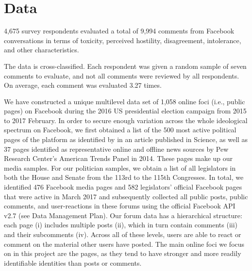 \documentclass{article}
\begin{document}

\section{Data}

4,675 survey respondents evaluated a total of 9,994 comments from Facebook conversations in terms of toxicity, perceived hostility, disagreement, intolerance, and other characteristics. 

The data is cross-classified. Each respondent was given a random sample of seven comments to evaluate, and not all comments were reviewed by all respondents. On average, each comment was evaluated 3.27 times. 

We have constructed a unique multilevel data set of 1,058 online foci (i.e., public pages) on Facebook during the 2016 US presidential election campaign from 2015 to 2017 February. In order to secure enough variation across the whole ideological spectrum on Facebook, we first obtained a list of the 500 most active political pages of the platform as identified by \citep{bakshy_exposure_2015} in an article published in Science, as well as 37 pages identified as representative online and offline news sources by Pew Research Center’s American Trends Panel in 2014. These pages make up our media samples. For our politician samples, we obtain a list of all legislators in both the House and Senate from the 113rd to the 115th Congresses. In total, we identified 476 Facebook media pages and 582 legislators’ official Facebook pages that were active in March 2017 and subsequently collected all public posts, public comments, and user-reactions in these forums using the official Facebook API v2.7 (see Data Management Plan). Our forum data has a hierarchical structure: each page (i) includes multiple posts (ii), which in turn contain comments (iii) and their subcomments (iv). Across all of these levels, users are able to react or comment on the material other users have posted. The main online foci we focus on in this project are the pages, as they tend to have stronger and more readily identifiable identities than posts or comments.
\end{document}
